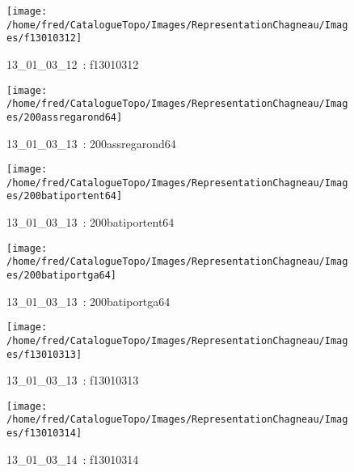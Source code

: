 \documentclass[12pt,titlepage]{book}
\begin{document}
\begin{figure}[h!]
\begin{minipage}[t]{3cm}
\begin{center}
      \texttt{[image: /home/fred/CatalogueTopo/Images/RepresentationChagneau/Images/f13010312]}
      \caption[~13\_01\_03\_12]{\small{13\_01\_03\_12~:} \tiny{f13010312}}\label{f13010312}
    \end{center}
  \end{minipage}
  \begin{minipage}[t]{3cm}
    \begin{center}
      \texttt{[image: /home/fred/CatalogueTopo/Images/RepresentationChagneau/Images/200assregarond64]}
      \caption[~13\_01\_03\_13]{\small{13\_01\_03\_13~:} \tiny{200assregarond64}}\label{200assregarond64}
    \end{center}
  \end{minipage}
  \begin{minipage}[t]{3cm}
    \begin{center}
      \texttt{[image: /home/fred/CatalogueTopo/Images/RepresentationChagneau/Images/200batiportent64]}
      \caption[~13\_01\_03\_13]{\small{13\_01\_03\_13~:} \tiny{200batiportent64}}\label{200batiportent64}
    \end{center}
  \end{minipage}
  \begin{minipage}[t]{3cm}
    \begin{center}
      \texttt{[image: /home/fred/CatalogueTopo/Images/RepresentationChagneau/Images/200batiportga64]}
      \caption[~13\_01\_03\_13]{\small{13\_01\_03\_13~:} \tiny{200batiportga64}}\label{200batiportga64}
    \end{center}
  \end{minipage}
  \begin{minipage}[t]{3cm}
    \begin{center}
      \texttt{[image: /home/fred/CatalogueTopo/Images/RepresentationChagneau/Images/f13010313]}
      \caption[~13\_01\_03\_13]{\small{13\_01\_03\_13~:} \tiny{f13010313}}\label{f13010313}
    \end{center}
  \end{minipage}
  \begin{minipage}[t]{3cm}
    \begin{center}
      \texttt{[image: /home/fred/CatalogueTopo/Images/RepresentationChagneau/Images/f13010314]}
      \caption[~13\_01\_03\_14]{\small{13\_01\_03\_14~:} \tiny{f13010314}}\label{f13010314}
    \end{center}
  \end{minipage}
\end{figure}
\end{document}
